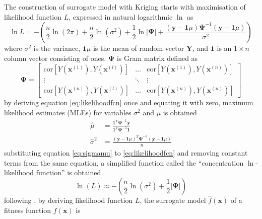 The construction of surrogate model with Kriging starts with maximisation of likelihood function $L$, expressed in natural logarithmic $\ln$ as
\begin{equation}
    \ln L = -\left(\frac{n}{2}\ln(2\pi) + \frac{n}{2}\ln(\sigma^{2}) + \frac{1}{2}\ln\lvert\boldsymbol{\Psi}\rvert + \frac{\left(\mathbf{y} - \mathbf{1}\mu\right)\boldsymbol{\Psi}^{-1}\left(\mathbf{y} - \mathbf{1}\mu\right)}{\sigma^{2}}\right)
    \label{eq:likelihoodfcn}
\end{equation}
where $\sigma^{2}$ is the variance, $\mathbf{1}\mu$ is the mean of random vector $\mathbf{Y}$, and $\mathbf{1}$ is an $1 \times n$ column vector consisting of ones. $\boldsymbol{\Psi}$ is Gram matrix defined as
\begin{equation}
    \boldsymbol{\Psi} =
        \begin{bmatrix}
            \mathrm{cor}[Y(\mathbf{x}^{(1)}),Y(\mathbf{x}^{(l)})] & \dots & \mathrm{cor}[Y(\mathbf{x}^{(1)}),Y(\mathbf{x}^{(n)})] \\
            \vdots & \ddots & \vdots \\
            \mathrm{cor}[Y(\mathbf{x}^{(n)}),Y(\mathbf{x}^{(l)})] & \dots & \mathrm{cor}[Y(\mathbf{x}^{(n)}),Y(\mathbf{x}^{(n)})]
        \end{bmatrix}
    \label{eq:grammat}
\end{equation}
by deriving equation \ref{eq:likelihoodfcn} once and equating it with zero, maximum likelihood estimates (MLEs) for variables $\sigma^{2}$ and $\mu$ is obtained
\begin{equation} \label{eq:sigmamu}
\begin{split}
    \hat{\mu} &= \frac{\mathbf{1}^{T}\boldsymbol{\Psi}^{-1}\mathbf{y}}{\mathbf{1}^{T}\boldsymbol{\Psi}^{-1}\mathbf{1}} \\
    \hat{\sigma}^{2} &= \frac{\left(\mathbf{y} - \mathbf{1}\mu\right)^{T}\boldsymbol{\Psi}^{-1}\left(\mathbf{y} - \mathbf{1}\mu\right)}{n}
\end{split}
\end{equation}
substituting equation \ref{eq:sigmamu} to \ref{eq:likelihoodfcn} and removing constant terms from the same equation, a simplified function called the ``concentration $\ln$-likelihood function'' is obtained
\begin{equation}
    \ln(L) \approx -\left(\frac{n}{2}\ln(\sigma^{2}) + \frac{1}{2}\lvert\boldsymbol{\Psi}\rvert\right)
    \label{eq:conclikelihood}
\end{equation}
following \citet{forrester}, by deriving likelihood function $L$, the surrogate model $\hat{f}(\mathbf{x})$ of a fitness function $f(\mathbf{x})$ is
